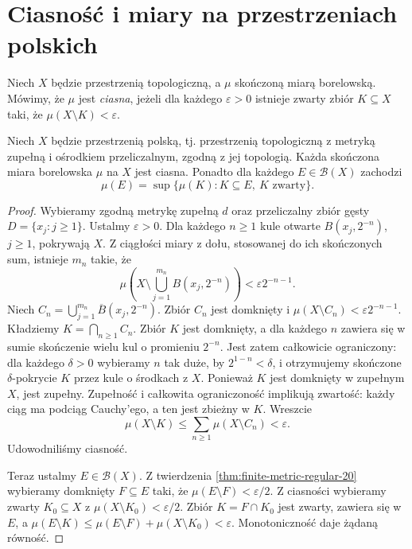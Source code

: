 \section{Ciasność i miary na przestrzeniach polskich}
\begin{definicja}
\label{def:tight-single-20}
Niech $X$ będzie przestrzenią topologiczną, a $\mu$
skończoną miarą borelowską. Mówimy, że $\mu$ jest
\emph{ciasna}, jeżeli dla każdego $\varepsilon>0$
istnieje zwarty zbiór $K\subseteq X$ taki,
że $\mu(X\setminus K)<\varepsilon$.
\end{definicja}

\begin{twierdzenie}
\label{thm:polish-tight-20}
Niech $X$ będzie przestrzenią polską, tj. przestrzenią
topologiczną z metryką zupełną i ośrodkiem przeliczalnym,
zgodną z jej topologią. Każda skończona miara borelowska
$\mu$ na $X$ jest ciasna. Ponadto dla każdego
$E\in\mathcal B(X)$ zachodzi
\[
 \mu(E)=\sup\{\mu(K):K\subseteq E,\ K\text{ zwarty}\}.
\]
\end{twierdzenie}
\begin{proof}
Wybieramy zgodną metrykę zupełną $d$ oraz przeliczalny
zbiór gęsty $D=\{x_j:j\ge1\}$. Ustalmy $\varepsilon>0$.
Dla każdego $n\ge1$ kule otwarte
$B(x_j,2^{-n})$, $j\ge1$, pokrywają $X$.
Z ciągłości miary z dołu, stosowanej do ich skończonych
sum, istnieje $m_n$ takie, że
\[
\mu\left(X\setminus\bigcup_{j=1}^{m_n}B(x_j,2^{-n})\right)
<\varepsilon 2^{-n-1}.
\]
Niech $C_n=\bigcup_{j=1}^{m_n}\overline{B}(x_j,2^{-n})$.
Zbiór $C_n$ jest domknięty i
$\mu(X\setminus C_n)<\varepsilon2^{-n-1}$.
Kładziemy $K=\bigcap_{n\ge1}C_n$.
Zbiór $K$ jest domknięty, a dla każdego $n$
zawiera się w sumie skończenie wielu kul o promieniu
$2^{-n}$. Jest zatem całkowicie ograniczony:
dla każdego $\delta>0$ wybieramy $n$ tak duże,
by $2^{1-n}<\delta$, i otrzymujemy skończone
$\delta$-pokrycie $K$ przez kule o środkach z $X$.
Ponieważ $K$ jest domknięty w zupełnym $X$, jest zupełny.
Zupełność i całkowita ograniczoność implikują zwartość:
każdy ciąg ma podciąg Cauchy'ego, a ten jest zbieżny
w $K$. Wreszcie
\[
 \mu(X\setminus K)
 \le\sum_{n\ge1}\mu(X\setminus C_n)<\varepsilon.
\]
Udowodniliśmy ciasność.

Teraz ustalmy $E\in\mathcal B(X)$. Z twierdzenia
\ref{thm:finite-metric-regular-20} wybieramy domknięty
$F\subseteq E$ taki, że $\mu(E\setminus F)<\varepsilon/2$.
Z ciasności wybieramy zwarty $K_0\subseteq X$
z $\mu(X\setminus K_0)<\varepsilon/2$.
Zbiór $K=F\cap K_0$ jest zwarty, zawiera się w $E$, a
$\mu(E\setminus K)\le\mu(E\setminus F)+\mu(X\setminus K_0)
<\varepsilon$. Monotoniczność daje żądaną równość.
\end{proof}

